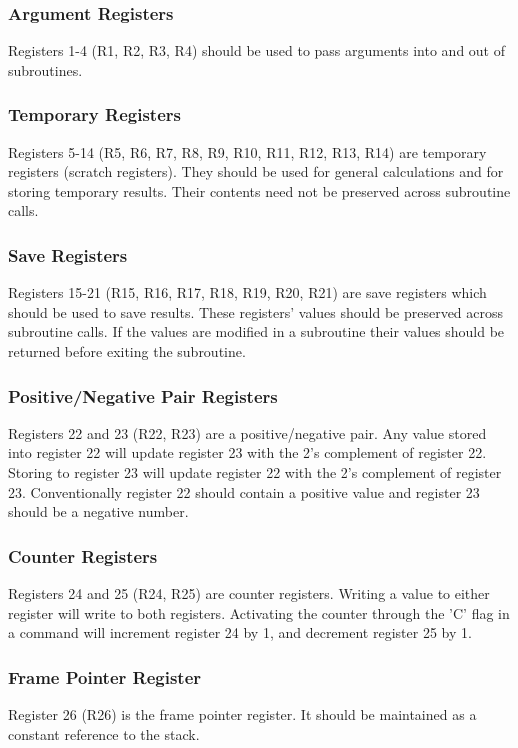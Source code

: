 \documentclass[12pt]{article}
\begin{document}
    \subsubsection{Argument Registers}
        Registers 1-4 (R1, R2, R3, R4) should be used to pass arguments into and out of subroutines.
        
    \subsubsection{Temporary Registers}
        Registers 5-14 (R5, R6, R7, R8, R9, R10, R11, R12, R13, R14) are temporary registers (scratch registers). They should be used for general calculations and for storing temporary results. Their contents need not be preserved across subroutine calls.
        
    \subsubsection{Save Registers}
        Registers 15-21 (R15, R16, R17, R18, R19, R20, R21) are save registers which should be used to save results. These registers' values should be preserved across subroutine calls. If the values are modified in a subroutine their values should be returned before exiting the subroutine.
        
    \subsubsection{Positive/Negative Pair Registers}
        Registers 22 and 23 (R22, R23) are a positive/negative pair. Any value stored into register 22 will update register 23 with the 2's complement of register 22. Storing to register 23 will update register 22 with the 2's complement of register 23. Conventionally register 22 should contain a positive value and register 23 should be a negative number.
        
    \subsubsection{Counter Registers}
        Registers 24 and 25 (R24, R25) are counter registers. Writing a value to either register will write to both registers. Activating the counter through the 'C' flag in a command will increment register 24 by 1, and decrement register 25 by 1.
        
    \subsubsection{Frame Pointer Register}
        Register 26 (R26) is the frame pointer register. It should be maintained as a constant reference to the stack.
        
\end{document}
